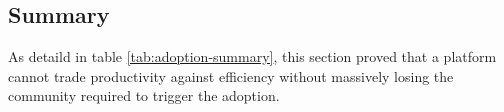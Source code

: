 
\subsection{Summary}

As detaild in table \ref{tab:adoption-summary}, this section proved that a platform cannot trade productivity against efficiency without massively losing the community required to trigger the adoption.












\endinput
